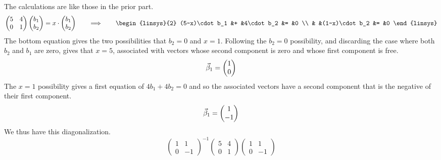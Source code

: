 \begin{exercises}
\begin{answer}
\begin{exparts}
      \partsitem The calculations are like those in the prior part.
          \begin{equation*}
            \begin{pmatrix}
               5  &4  \\
               0  &1
            \end{pmatrix}
            \colvec{b_1 \\ b_2}
            =x\cdot\colvec{b_1 \\ b_2}
            \qquad\Longrightarrow\qquad 
            \begin{linsys}{2}
               (5-x)\cdot b_1  &+  &4\cdot b_2     &=  &0  \\
                               &   &(1-x)\cdot b_2 &=  &0
            \end{linsys}
          \end{equation*}
          The bottom equation
          gives the two possibilities that $b_2=0$ and $x=1$.
          Following the $b_2=0$ possibility, and discarding the
          case where both $b_2$ and $b_1$ are zero, gives
          that $x=5$, associated with vectors whose second component
          is zero and whose first component is free.
          \begin{equation*}
            \vec{\beta}_1=\begin{pmatrix} 1 \\ 0 \end{pmatrix}
          \end{equation*}
          The $x=1$ possibility gives a first equation of
          $4b_1+4b_2=0$ and so the associated vectors have a 
          second component that is the negative of their first component.
          \begin{equation*}
            \vec{\beta}_1=\begin{pmatrix} 1 \\ -1 \end{pmatrix}
          \end{equation*}
          We thus have this diagonalization.
          \begin{equation*}
            \begin{pmatrix}
              1  &1  \\
              0  &-1
            \end{pmatrix}^{-1}
            \begin{pmatrix}
               5  &4  \\
               0  &1
            \end{pmatrix}
            \begin{pmatrix}
              1  &1  \\
              0  &-1
            \end{pmatrix}

\end{equation*}
\end{exparts}
\end{answer}
\end{exercises}
